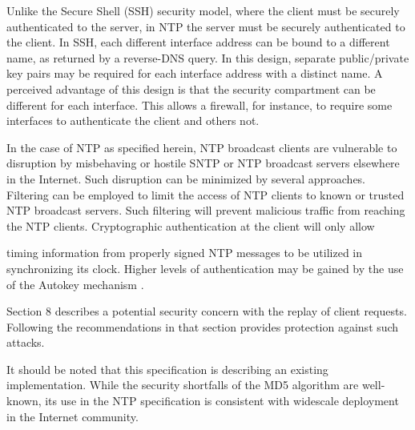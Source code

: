Unlike the Secure Shell (SSH) security model, where the client must
be securely authenticated to the server, in NTP the server must be
securely authenticated to the client.  In SSH, each different
interface address can be bound to a different name, as returned by a
reverse-DNS query.  In this design, separate public/private key pairs
may be required for each interface address with a distinct name.  A
perceived advantage of this design is that the security compartment
can be different for each interface.  This allows a firewall, for
instance, to require some interfaces to authenticate the client and
others not.

In the case of NTP as specified herein, NTP broadcast clients are
vulnerable to disruption by misbehaving or hostile SNTP or NTP
broadcast servers elsewhere in the Internet.  Such disruption can be
minimized by several approaches.  Filtering can be employed to limit
the access of NTP clients to known or trusted NTP broadcast servers.
Such filtering will prevent malicious traffic from reaching the NTP
clients.  Cryptographic authentication at the client will only allow

timing information from properly signed NTP messages to be utilized
in synchronizing its clock.  Higher levels of authentication may be
gained by the use of the Autokey mechanism \cite{RFC5906}.

Section 8 describes a potential security concern with the replay of
client requests.  Following the recommendations in that section
provides protection against such attacks.

It should be noted that this specification is describing an existing
implementation.  While the security shortfalls of the MD5 algorithm
are well-known, its use in the NTP specification is consistent with
widescale deployment in the Internet community.
